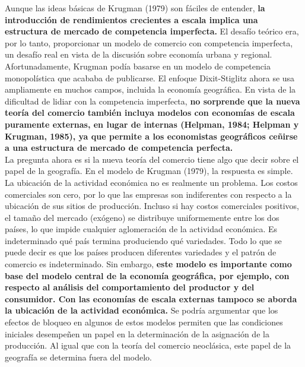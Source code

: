 Aunque las ideas básicas de Krugman (1979) son fáciles de entender, \textbf{la introducción de rendimientos crecientes a escala implica una estructura de mercado de competencia imperfecta.} El desafío teórico era, por lo tanto, proporcionar un modelo de comercio con competencia imperfecta, un desafío real en vista de la discusión sobre economía urbana y regional. Afortunadamente, Krugman podía basarse en un modelo de competencia monopolística que acababa de publicarse. El enfoque Dixit-Stiglitz ahora se usa ampliamente en muchos campos, incluida la economía geográfica. En vista de la dificultad de lidiar con la competencia imperfecta, \textbf{no sorprende que la nueva teoría del comercio también incluya modelos con economías de escala puramente externas, en lugar de internas (Helpman, 1984; Helpman y Krugman, 1985), ya que permite a los economistas geográficos ceñirse a una estructura de mercado de competencia perfecta.}\\
La pregunta ahora es si la nueva teoría del comercio tiene algo que decir sobre el papel de la geografía. En el modelo de Krugman (1979), la respuesta es simple. La ubicación de la actividad económica no es realmente un problema. Los costos comerciales son cero, por lo que las empresas son indiferentes con respecto a la ubicación de sus sitios de producción. Incluso si hay costos comerciales positivos, el tamaño del mercado (exógeno) se distribuye uniformemente entre los dos países, lo que impide cualquier aglomeración de la actividad económica. Es indeterminado qué país termina produciendo qué variedades. Todo lo que se puede decir es que los países producen diferentes variedades y el patrón de comercio es indeterminado. Sin embargo, \textbf{este modelo es importante como base del modelo central de la economía geográfica, por ejemplo, con respecto al análisis del comportamiento del productor y del consumidor. Con las economías de escala externas tampoco se aborda la ubicación de la actividad económica.} Se podría argumentar que los efectos de bloqueo en algunos de estos modelos permiten que las condiciones iniciales desempeñen un papel en la determinación de la asignación de la producción. Al igual que con la teoría del comercio neoclásica, este papel de la geografía se determina fuera del modelo.

